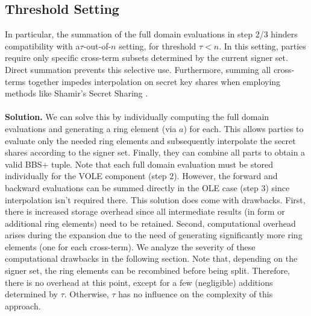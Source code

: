 \subsection{Threshold Setting}
\label{subsec:tauoutofnSetting}
In particular, the summation of the full domain evaluations in step 2/3 hinders compatibility with a$\tau$-out-of-$n$ setting, for threshold $\tau < n$. In this setting, parties require only specific cross-term subsets determined by the current signer set. Direct summation prevents this selective use. Furthermore, summing all cross-terms together impedes interpolation on secret key shares when employing methods like Shamir's Secret Sharing \cite{shamir1979share}.  
\\\\
\textbf{Solution.} We can solve this by individually computing the full domain evaluations and generating a ring element (via $a$) for each. This allows parties to evaluate only the needed ring elements and subsequently interpolate the secret shares according to the signer set. Finally, they can combine all parts to obtain a valid BBS+ tuple. Note that each full domain evaluation must be stored individually for the VOLE component (step 2). However, the forward and backward evaluations can be summed directly in the OLE case (step 3) since interpolation isn't required there. This solution does come with drawbacks. First, there is increased storage overhead since all intermediate results (in form or additional ring elements) need to be retained. Second, computational overhead arises during the expansion due to the need of generating significantly more ring elements (one for each cross-term). We analyze the severity of these computational drawbacks in the following section. Note that, depending on the signer set, the ring elements can be recombined before being split. Therefore, there is no overhead at this point, except for a few (negligible) additions determined by $\tau$. Otherwise, $\tau$ has no influence on the complexity of this approach.

